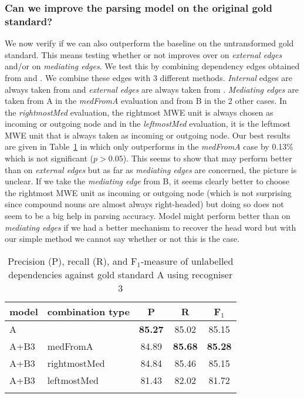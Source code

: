 \documentclass[output=paper]{langsci/langscibook}
\begin{document}
\subsubsection{Can we improve the parsing model on the original gold standard?}
\indent We now verify if we can also outperform the baseline on the untransformed gold standard. This means testing whether or not {\modelB} improves over {\modelA} on \textit{external edges} and/or on \textit{mediating edges}. We test this by combining dependency edges obtained from {\modelA} and {\modelB}. We combine these edges with 3 different methods. \textit{Internal} edges are always taken from {\modelA} and \textit{external edges} are always taken from {\modelB}. \textit{Mediating edges} are taken from A in the \textit{medFromA} evaluation and from B in the 2 other cases. In the \textit{rightmostMed} evaluation, the rightmost MWE unit is always chosen as incoming or outgoing node and in the \textit{leftmostMed} evaluation, it is the leftmost MWE unit that is always taken as incoming or outgoing node. Our best results are given in Table~\ref{del:tab:res2} in which {\modelB} only outperforms {\modelA} in the \textit{medFromA} case by 0.13\% which is not significant ($p>0.05$). This seems to show that {\modelB} may perform better than {\modelA} on \textit{external edges} but as far as \textit{mediating edges} are concerned, the picture is unclear. If we take the \textit{mediating edge} from B, it seems clearly better to choose the rightmost MWE unit as incoming or outgoing node (which is not surprising since compound nouns are almost always right-headed) but doing so does not seem to be a big help in parsing accuracy. Model might perform better than {\modelA} on \textit{mediating edges} if we had a better mechanism to recover the head word but with our simple method we cannot say whether or not this is the case.

\begin{table}[h]
    \centering
    \begin{tabular}{l l c c c} %
      \lsptoprule
        \textnormal{model}
        & \textnormal{combination type}
        & \textnormal{P}
        & \textnormal{R}
        & \textnormal{F$_1$}
        \\ %
        \midrule
        A & & \textbf{85.27} & 85.02 & 85.15\\
        A+B3 & medFromA &84.89  &\textbf{85.68} & \textbf{85.28} \\
        A+B3 & rightmostMed &84.84  &85.46  & 85.15 \\
        A+B3 & leftmostMed &81.43  &82.02  & 81.72 \tabularnewline %
        \lspbottomrule
    \end{tabular}
    \caption{Precision (P), recall (R), and F$_1$-measure of unlabelled dependencies against gold standard A using recogniser 3\label{del:tab:res2}}
\end{table}
\end{document}
